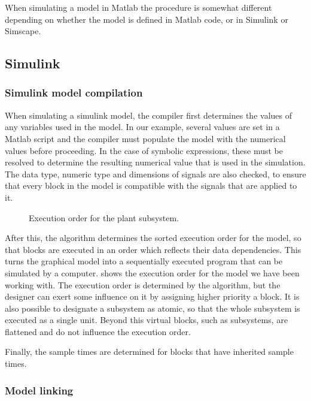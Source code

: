 \documentclass[\rootfolder/main.tex]{subfiles}
\begin{document}
When simulating a model in Matlab the procedure is somewhat different depending on whether the model is defined in Matlab code, or in Simulink or Simscape.

\subsection{Simulink}

\subsubsection{Simulink model compilation}

When simulating a simulink model, the compiler first determines the values of any variables used in the model.
In our example, several values are set in a Matlab script and the compiler must populate the model with the numerical values before proceeding.
In the case of symbolic expressions, these must be resolved to determine the resulting numerical value that is used in the simulation.
The data type, numeric type and dimensions of signals are also checked, to ensure that every block in the model is compatible with the signals that are applied to it.

\begin{figure}[ht]
    \caption{Execution order for the plant subsystem.\label{fig:inertial-simulink-order}}
\end{figure}

After this, the algorithm determines the sorted execution order for the model, so that blocks are executed in an order which reflects their data dependencies.
This turns the graphical model into a sequentially executed program that can be simulated by a computer.
 shows the execution order for the model we have been working with.
The execution order is determined by the algorithm, but the designer can exert some influence on it by assigning higher priority a block.
It is also possible to designate a subsystem as atomic, so that the whole subsystem is executed as a single unit.
Beyond this virtual blocks, such as subsystems, are flattened and do not influence the execution order.

Finally, the sample times are determined for blocks that have inherited sample times.

\subsubsection{Model linking}
\end{document}
